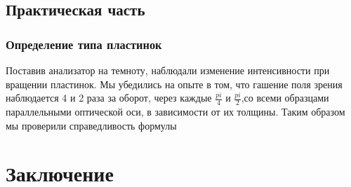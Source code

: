 \subsection{Практическая часть}
\subsubsection{Определение типа пластинок}
Поставив анализатор на темноту, наблюдали изменение интенсивности при вращении пластинок. 
Мы убедились на опыте в том, что гашение поля зрения наблюдается 4 и 2 раза за оборот, через каждые 
$\frac{pi}{4}$ и $\frac{pi}{2}$,со всеми образцами параллельными оптической оси, в зависимости от их толщины. Таким образом мы проверили справедливость формулы




\newpage
\section{Заключение}

